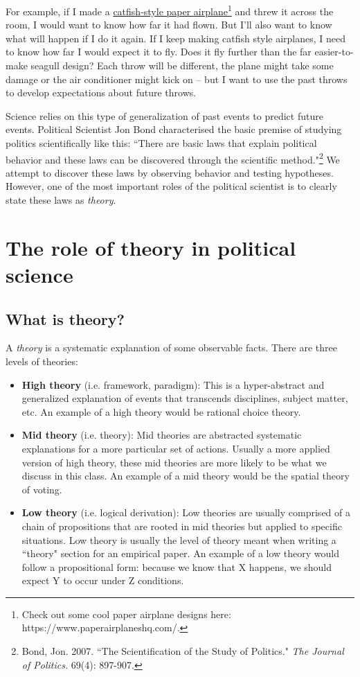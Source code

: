 \documentclass[10pt]{article}
\begin{document}
For example, if I made a \href{https://www.paperairplaneshq.com/planes/catfish.html}{catfish-style paper airplane}\footnote{Check out some cool paper airplane designs here: https://www.paperairplaneshq.com/.} and threw it across the room, I would want to know how far it had flown. But I'll also want to know what will happen if I do it again. If I keep making catfish style airplanes, I need to know how far I would expect it to fly. Does it fly further than the far easier-to-make seagull design? Each throw will be different, the plane might take some damage or the air conditioner might kick on -- but I want to use the past throws to develop expectations about future throws. 

Science relies on this type of generalization of past events to predict future events. Political Scientist Jon Bond characterised the basic premise of studying politics scientifically like this: ``There are basic laws that explain political behavior and these laws can be discovered through the scientific method."\footnote{Bond, Jon. 2007. ``The Scientification of the Study of Politics." \textit{The Journal of Politics.} 69(4): 897-907.} We attempt to discover these laws by observing behavior and testing hypotheses. However, one of the most important roles of the political scientist is to clearly state these laws as \textit{theory}. 



\section{The role of theory in political science}

\subsection{What is theory?}

A \textit{theory} is a systematic explanation of some observable facts. There are three levels of theories: 

\begin{itemize}
    \item \textbf{High theory} (i.e. framework, paradigm): This is a hyper-abstract and generalized explanation of events that transcends disciplines, subject matter, etc. An example of a high theory would be rational choice theory.
    \item \textbf{Mid theory} (i.e. theory): Mid theories are abstracted systematic explanations for a more particular set of actions. Usually a more applied version of high theory, these mid theories are more likely to be what we discuss in this class. An example of a mid theory would be the spatial theory of voting. 
    \item \textbf{Low theory} (i.e. logical derivation): Low theories are usually comprised of a chain of propositions that are rooted in mid theories but applied to specific situations. Low theory is usually the level of theory meant when writing a ``theory" section for an empirical paper. An example of a low theory would follow a propositional form: because we know that X happens, we should expect Y to occur under Z conditions. 
\end{itemize}
\end{document}
